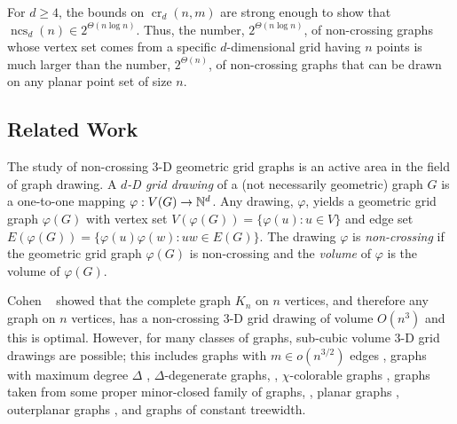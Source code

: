 \documentclass{patmorin}
\DeclareMathOperator{\crs}{cr}
\DeclareMathOperator{\ncs}{ncs}
\begin{document}
For $d\ge 4$, the bounds on $\crs_d(n,m)$ are strong enough to show that
$\ncs_d(n)\in 2^{\Theta(n\log n)}$.  Thus, the number, $2^{\Theta(n\log
n)}$, of non-crossing graphs whose vertex set comes from a specific
$d$-dimensional grid having $n$ points is much larger than the number,
$2^{\Theta(n)}$,  of non-crossing graphs that can be drawn on any planar
point set of size $n$.

\subsection{Related Work}

The study of non-crossing 3-D geometric grid graphs is an
active area in the field of graph drawing.  A \emph{$d$-D
grid drawing} of a (not necessarily geometric) graph $G$ is a
one-to-one mapping $\varphi:V(G)\rightarrow \mathbb{N}^d$.  Any drawing,
$\varphi$, yields a geometric grid graph $\varphi(G)$ with
vertex set $V(\varphi(G))=\{\varphi(u):u\in V\}$ and edge set
$E(\varphi(G))=\{\varphi(u)\varphi(w):uw\in E(G)\}$.  The drawing
$\varphi$ is \emph{non-crossing} if the geometric grid graph $\varphi(G)$
is non-crossing and the \emph{volume} of $\varphi$ is the volume of
$\varphi(G)$.

Cohen \etal~\cite{cohen.eades.ea:three-dimensional} showed that the
complete graph $K_n$ on $n$ vertices, and therefore any graph on $n$
vertices, has a non-crossing 3-D grid drawing of volume $O(n^3)$ and this
is optimal.  However, for many classes of graphs, sub-cubic volume 3-D
grid drawings are possible; this includes 
graphs with $m\in o(n^{3/2})$ edges
  \cite{dujmovic.wood:three-dimensional}, 
graphs with maximum degree $\Delta$ 
  \cite{dujmovic.wood:three-dimensional,dujmovic.wood:upward},
$\Delta$-degenerate graphs,
  \cite{dujmovic.wood:three-dimensional}, 
$\chi$-colorable graphs
  \cite{pach.thiele.ea:three-dimensional}, 
graphs taken from some proper minor-closed family of graphs, 
  \cite{dujmovic.wood:three-dimensional}, 
planar graphs
  \cite{battista.frati.ea:on},
outerplanar graphs
  \cite{felsner.liotta.ea:straight-line},
and graphs of constant treewidth.  
\end{document}
